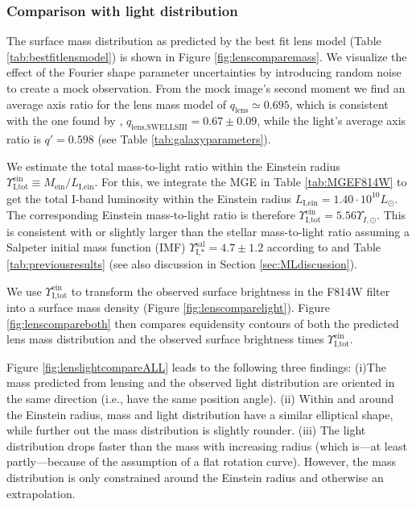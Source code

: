 \documentclass[useAMS,usenatbib]{mnras}
\begin{document}
\subsubsection{Comparison with light distribution} \label{sec:results_lensing_compare}

The surface mass distribution as predicted by the best fit lens model (Table \ref{tab:bestfitlensmodel}) is shown in Figure \ref{fig:lenscomparemass}. We visualize the effect of the Fourier shape parameter uncertainties by introducing random noise to create a mock observation. From the mock image's second moment we find an average axis ratio for the lens mass model of $q_\text{lens} \simeq 0.695$, which is consistent with the one found by \citet{SWELLSIII}, $q_\text{lens,SWELLSIII} = 0.67 \pm 0.09$, while the light's average axis ratio is $q' = 0.598$ (see Table \ref{tab:galaxyparameters}).

We estimate the total mass-to-light ratio within the Einstein radius $\Upsilon_\text{I,tot}^\text{ein} \equiv M_\text{ein} / L_\text{I,ein}$. For this, we integrate the MGE in Table \ref{tab:MGEF814W} to get the total I-band luminosity within the Einstein radius $L_\text{I,ein} = 1.40\cdot 10^{10} L_\odot$. The corresponding Einstein mass-to-light ratio is therefore $\Upsilon_\text{I,tot}^\text{ein} = 5.56 \Upsilon_{I,\odot}$. This is consistent with or slightly larger than the stellar mass-to-light ratio assuming a Salpeter initial mass function (IMF) $\Upsilon_\text{I,*}^\text{sal} = 4.7 \pm 1.2$ according to \citet{SWELLSI} and Table \ref{tab:previousresults} (see also discussion in Section \ref{sec:MLdiscussion}).

We use $\Upsilon_\text{I,tot}^\text{ein}$ to transform the observed surface brightness in the F814W filter into a surface mass density (Figure \ref{fig:lenscomparelight}). Figure \ref{fig:lenscompareboth} then compares equidensity contours of both the predicted lens mass distribution and the observed surface brightness times $\Upsilon_\text{I,tot}^\text{ein}$.

Figure \ref{fig:lenslightcompareALL} leads to the following three findings: (i)The mass predicted from lensing and the observed light distribution are oriented in the same direction (i.e., have the same position angle). (ii) Within and around the Einstein radius, mass and light distribution have a similar elliptical shape, while further out the mass distribution is slightly rounder. (iii) The light distribution drops faster than the mass with increasing radius (which is---at least partly---because of the assumption of a flat rotation curve). However, the mass distribution is only constrained around the Einstein radius and otherwise an extrapolation. 
\end{document}
